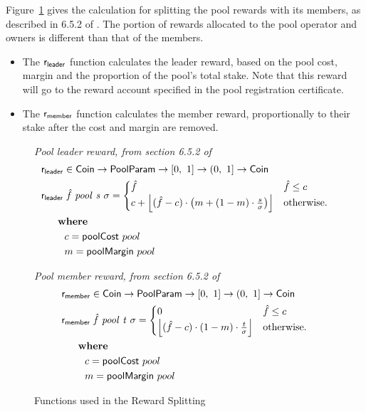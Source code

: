 \clearpage

Figure~\ref{fig:functions:reward-splitting} gives the calculation for
splitting the pool rewards with its members, as described in 6.5.2 of \cite{delegation_design}.
The portion of rewards allocated to the pool operator and owners is different
than that of the members.

\begin{itemize}
  \item The $\fun{r_{leader}}$ function calculates the leader reward, based on the pool cost,
    margin and the proportion of the pool's total stake.  Note that this reward will go to the
    reward account specified in the pool registration certificate.
  \item The $\fun{r_{member}}$ function calculates the member reward, proportionally to their
    stake after the cost and margin are removed.
\end{itemize}

\begin{figure}[htb]
  \emph{Pool leader reward, from section 6.5.2 of \cite{delegation_design}}
  \begin{align*}
      & \fun{r_{leader}} \in \Coin \to \PoolParam \to \unitInterval \to \unitIntervalNonNull \to \Coin \\
      & \lReward{\hat{f}}{pool}{s}{\sigma} =
        \begin{cases}
        \hat{f} & \hat{f} \leq c\\
        c + \floor*{(\hat{f} - c)\cdot\left(m + (1-m)\cdot\frac{s}{\sigma}\right) }&
        \text{otherwise.}
      \end{cases} \\
      & ~~~\where \\
      & ~~~~~~~c = \fun{poolCost}~pool \\
      & ~~~~~~~m = \fun{poolMargin}~pool \\
  \end{align*}

  \emph{Pool member reward, from section 6.5.2 of \cite{delegation_design}}
  \begin{align*}
    & \fun{r_{member}} \in \Coin \to \PoolParam \to \unitInterval \to \unitIntervalNonNull \to \Coin \\
    & \mReward{\hat{f}}{pool}{t}{\sigma} =
      \begin{cases}
        0 & \hat{f} \leq c\\
        \floor*{(\hat{f} - c)\cdot(1-m)\cdot\frac{t}{\sigma}} &
        \text{otherwise.}
      \end{cases} \\
    & ~~~\where \\
    & ~~~~~~~c = \fun{poolCost}~pool \\
    & ~~~~~~~m = \fun{poolMargin}~pool \\
  \end{align*}

  \caption{Functions used in the Reward Splitting}
  \label{fig:functions:reward-splitting}
\end{figure}


